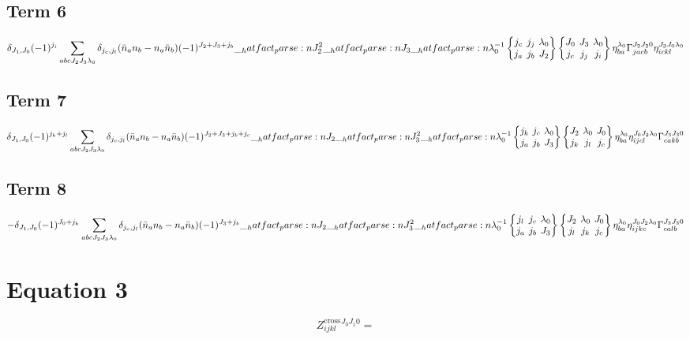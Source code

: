 \documentclass{scrartcl}
\newcommand{\sixj}[6]{\begingroup\setlength{\arraycolsep}{0.2em}\begin{Bmatrix} #1 & #2 & #3 \\ #4 & #5 & #6 \end{Bmatrix}\endgroup}
\begin{document}
\subsection{Term 6}
\begin{dmath*}
\delta_{{J}_{1},{J}_{0}} \* (-1)^{{j}_{i}} \* \sum_{a b c {J}_{2} {J}_{3} {{\lambda}}_{0}} \* \delta_{{j}_{c},{j}_{l}} \* (\bar{n}_{a} \* n_{b} -n_{a} \* \bar{n}_{b}) \* (-1)^{{J}_{2}+{J}_{3}+{j}_{b}} \* \hatfact{{J}_{2}^{2}} \* \hatfact{{J}_{3}} \* \hatfact{{{\lambda}}_{0}^{-1}} \* \sixj{{j}_{c}}{{j}_{j}}{{{\lambda}}_{0}}{{j}_{a}}{{j}_{b}}{{J}_{2}} \* \sixj{{J}_{0}}{{J}_{3}}{{{\lambda}}_{0}}{{j}_{c}}{{j}_{j}}{{j}_{i}} \* \eta_{b a}^{{{\lambda}}_{0}} \* \Gamma_{j a c b}^{{J}_{2} {J}_{2} 0} \* \eta_{i c k l}^{{J}_{3} {J}_{0} {{\lambda}}_{0}}
\end{dmath*}
\subsection{Term 7}
\begin{dmath*}
\delta_{{J}_{1},{J}_{0}} \* (-1)^{{j}_{k}+{j}_{l}} \* \sum_{a b c {J}_{2} {J}_{3} {{\lambda}}_{0}} \* \delta_{{j}_{c},{j}_{l}} \* (\bar{n}_{a} \* n_{b} -n_{a} \* \bar{n}_{b}) \* (-1)^{{J}_{2}+{J}_{3}+{j}_{b}+{j}_{c}} \* \hatfact{{J}_{2}} \* \hatfact{{J}_{3}^{2}} \* \hatfact{{{\lambda}}_{0}^{-1}} \* \sixj{{j}_{k}}{{j}_{c}}{{{\lambda}}_{0}}{{j}_{a}}{{j}_{b}}{{J}_{3}} \* \sixj{{J}_{2}}{{{\lambda}}_{0}}{{J}_{0}}{{j}_{k}}{{j}_{l}}{{j}_{c}} \* \eta_{b a}^{{{\lambda}}_{0}} \* \eta_{i j c l}^{{J}_{0} {J}_{2} {{\lambda}}_{0}} \* \Gamma_{c a k b}^{{J}_{3} {J}_{3} 0}
\end{dmath*}
\subsection{Term 8}
\begin{dmath*}
-\delta_{{J}_{1},{J}_{0}} \* (-1)^{{J}_{0}+{j}_{k}} \* \sum_{a b c {J}_{2} {J}_{3} {{\lambda}}_{0}} \* \delta_{{j}_{c},{j}_{l}} \* (\bar{n}_{a} \* n_{b} -n_{a} \* \bar{n}_{b}) \* (-1)^{{J}_{3}+{j}_{b}} \* \hatfact{{J}_{2}} \* \hatfact{{J}_{3}^{2}} \* \hatfact{{{\lambda}}_{0}^{-1}} \* \sixj{{j}_{l}}{{j}_{c}}{{{\lambda}}_{0}}{{j}_{a}}{{j}_{b}}{{J}_{3}} \* \sixj{{J}_{2}}{{{\lambda}}_{0}}{{J}_{0}}{{j}_{l}}{{j}_{k}}{{j}_{c}} \* \eta_{b a}^{{{\lambda}}_{0}} \* \eta_{i j k c}^{{J}_{0} {J}_{2} {{\lambda}}_{0}} \* \Gamma_{c a l b}^{{J}_{3} {J}_{3} 0}
\end{dmath*}

\section{Equation 3}
\begin{dmath*}
Z^{\mathrm{cross}}_{i j k l}^{{J}_{0} {J}_{1} 0} = 
\end{dmath*}
\end{document}
